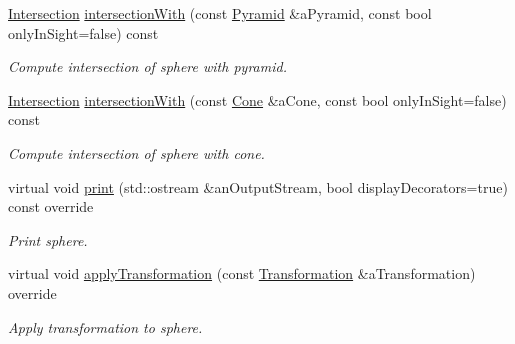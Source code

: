 \begin{DoxyCompactItemize}
\hyperlink{classlibrary_1_1math_1_1geom_1_1d3_1_1_intersection}{Intersection} \hyperlink{classlibrary_1_1math_1_1geom_1_1d3_1_1objects_1_1_sphere_ac7a5e8323eca47f121a457b99fbf6627}{intersection\+With} (const \hyperlink{classlibrary_1_1math_1_1geom_1_1d3_1_1objects_1_1_pyramid}{Pyramid} \&a\+Pyramid, const bool only\+In\+Sight=false) const
\begin{DoxyCompactList}\small\item\em Compute intersection of sphere with pyramid. \end{DoxyCompactList}\item 
\hyperlink{classlibrary_1_1math_1_1geom_1_1d3_1_1_intersection}{Intersection} \hyperlink{classlibrary_1_1math_1_1geom_1_1d3_1_1objects_1_1_sphere_a392e154250dcef56f80e071f50e81809}{intersection\+With} (const \hyperlink{classlibrary_1_1math_1_1geom_1_1d3_1_1objects_1_1_cone}{Cone} \&a\+Cone, const bool only\+In\+Sight=false) const
\begin{DoxyCompactList}\small\item\em Compute intersection of sphere with cone. \end{DoxyCompactList}\item 
virtual void \hyperlink{classlibrary_1_1math_1_1geom_1_1d3_1_1objects_1_1_sphere_adc05fd7666ae15513e6aa9ec66a1ca9b}{print} (std\+::ostream \&an\+Output\+Stream, bool display\+Decorators=true) const override
\begin{DoxyCompactList}\small\item\em Print sphere. \end{DoxyCompactList}\item 
virtual void \hyperlink{classlibrary_1_1math_1_1geom_1_1d3_1_1objects_1_1_sphere_acb4ca3f037791f9f71bffc904a1bf961}{apply\+Transformation} (const \hyperlink{classlibrary_1_1math_1_1geom_1_1d3_1_1_transformation}{Transformation} \&a\+Transformation) override
\begin{DoxyCompactList}\small\item\em Apply transformation to sphere. \end{DoxyCompactList}\end{DoxyCompactItemize}
